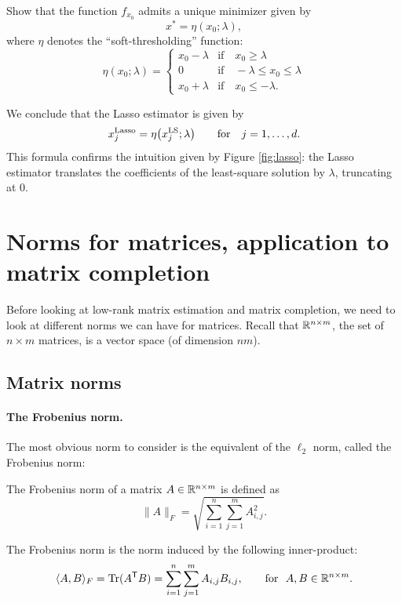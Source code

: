 \documentclass[11pt,nocut]{article}
\begin{document}
\begin{exercise}
	Show that the function $f_{x_0}$ admits a unique minimizer given by
	$$
	x^* = \eta(x_0; \lambda),
	$$
	where $\eta$ denotes the ``soft-thresholding'' function:
	$$
	\eta(x_0;\lambda) = 
	\begin{cases}
		x_0-\lambda & \text{if} \quad x_0 \geq \lambda \\
		0 & \text{if} \quad -\lambda \leq x_0 \leq \lambda \\
		x_0 + \lambda & \text{if} \quad x_0 \leq -\lambda.
	\end{cases}
	$$
\end{exercise}
\vspace{2mm}

We conclude that the Lasso estimator is given by
$$
x^{\rm Lasso}_{j} = \eta\big(x_j^{\rm LS}; \lambda\big) \qquad \text{for} \quad j=1, \dots, d.
$$
This formula confirms the intuition given by Figure \ref{fig:lasso}: the Lasso estimator translates the coefficients of the least-square solution by $\lambda$, truncating at $0$.


\section{Norms for matrices, application to matrix completion}

Before looking at low-rank matrix estimation and matrix completion, we need to look at different norms we can have for matrices. Recall that $\mathbb{R}^{n \times m}$, the set of $n \times m$ matrices, is a vector space (of dimension $nm$).

\subsection{Matrix norms}

\paragraph{The Frobenius norm.} The most obvious norm to consider is the equivalent of the $\ell_2$ norm, called the Frobenius norm:
\begin{definition}
	The Frobenius norm of a matrix $A \in \mathbb{R}^{n \times m}$ is defined as
	$$
	\|A\|_F = \sqrt{\sum_{i=1}^n \sum_{j=1}^m A_{i,j}^2}. 
	$$
\end{definition}

\begin{remark}
	The Frobenius norm is the norm induced by the following inner-product:
	$$
	\langle A,B \rangle_{F} = {{\rm Tr}}(A^{{\sf T}}B) = \sum_{i=1}^n\sum_{j=1}^m A_{i,j} B_{i,j}, \qquad \text{for} \ \ A,B \in \mathbb{R}^{n \times m}.
	$$
\end{remark}
\end{document}
